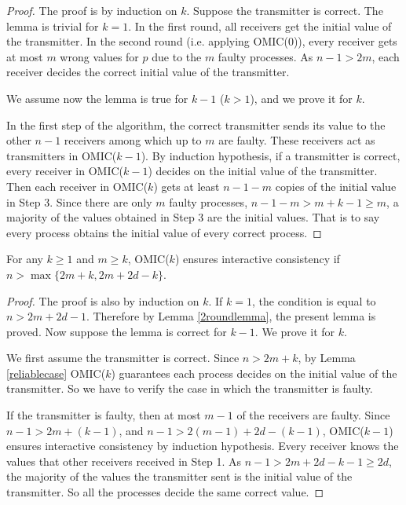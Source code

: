 \begin{proof}
  The proof is by induction on $k$. Suppose the transmitter is correct. The
  lemma is trivial for $k=1$.
In the first round, all receivers get the initial value of the transmitter. In the second
  round (i.e. applying OMIC($0$)), every receiver gets at most $m$ wrong
  values for $p$ due to the $m$ faulty processes.
 As $n-1>2m$, each
  receiver decides the correct initial value of the transmitter.

  We assume now the
  lemma is true for $k-1$ ($k>1$), and we prove it for $k$.
  
 

  In the first step of the algorithm, the correct transmitter sends its value
  to the other $n-1$ receivers among which up to $m$ are faulty. 
  These receivers act as transmitters in OMIC($k-1$). 
  By induction hypothesis, if a transmitter is correct, every receiver in OMIC($k-1$)
  decides on the initial value of the transmitter.
  Then each receiver in OMIC($k$)  gets at least $n-1-m$ copies of the
  initial value in Step $3$. Since there are only $m$ faulty processes,
  $n-1-m>m+k-1 \geqslant m$, a majority of the values obtained  in Step $3$
  are the initial values. That is to say every process obtains the initial
  value of every correct process.
\end{proof}

\begin{lemma}\label{coreLemma}
  \label{mainlemma}For any $k \geqslant 1$ and $m \geqslant k$, OMIC($k$) ensures
  interactive consistency if $n>\max\{2m+k,2m+2d-k\}$.
\end{lemma}

\begin{proof}
  The proof is also by induction on $k$. If $k=1$, the condition is equal to $n>2m+2d-1$.
  Therefore by Lemma \ref{2roundlemma}, the present lemma is proved.
  Now suppose
  the lemma is correct for $k-1$. We prove it for $k$.
  
  We first assume the transmitter is correct. Since $n>2m+k$, by Lemma
  \ref{reliablecase} OMIC($k$) guarantees each process decides on  the initial
  value of the transmitter. So we have to verify the case in which
  the transmitter is faulty.
  
  If the transmitter is faulty, then at most $m-1$ of the receivers are
  faulty. Since $n-1>2m+ ( k-1 )$, and $n-1>2 ( m-1 ) +2d- (
  k-1 )$, OMIC($k-1$) ensures interactive consistency by induction hypothesis.
  Every receiver  knows the values that other receivers received in Step 1. As
  $n-1>2m+2d-k-1 \geqslant 2d$, the majority of the values the transmitter
  sent is the initial value of the transmitter. So all the processes decide
  the same correct value.
\end{proof}



